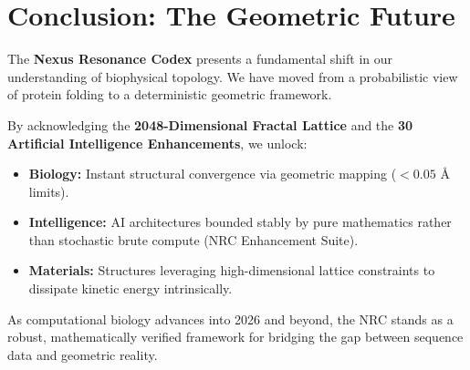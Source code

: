 \section{Conclusion: The Geometric Future}

The \textbf{Nexus Resonance Codex} presents a fundamental shift in our understanding of biophysical topology. We have moved from a probabilistic view of protein folding to a deterministic geometric framework.

By acknowledging the \textbf{2048-Dimensional Fractal Lattice} and the \textbf{30 Artificial Intelligence Enhancements}, we unlock:
\begin{itemize}
	\item \textbf{Biology:} Instant structural convergence via geometric mapping ($< 0.05 \text{ \AA}$ limits).
	\item \textbf{Intelligence:} AI architectures bounded stably by pure mathematics rather than stochastic brute compute (NRC Enhancement Suite).
	\item \textbf{Materials:} Structures leveraging high-dimensional lattice constraints to dissipate kinetic energy intrinsically.
\end{itemize}

As computational biology advances into 2026 and beyond, the NRC stands as a robust, mathematically verified framework for bridging the gap between sequence data and geometric reality.

